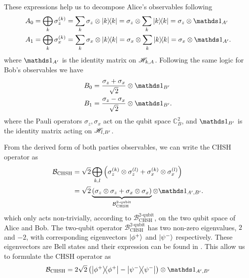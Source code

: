 These expressions help us to decompose Alice's observables following
\begin{equation}
	\begin{split}
		A_0 &= \bigoplus_k \sigma_z^{(k)} = \sum_k \sigma_z \otimes \ketbra{k}  = \sigma_z \otimes \sum_k \ketbra{k} = \sigma_z \otimes \id_{A'} \\
		A_1 &= \bigoplus_k \sigma_x^{(k)} = \sum_k \sigma_x \otimes \ketbra{k}  = \sigma_x \otimes \sum_k \ketbra{k} = \sigma_x \otimes \id_{A'}.
	\end{split}
	\label{eq:pauli_Alice}
\end{equation}
where $\id_{A'}$ is the identity matrix on $\mathscr{H}_{k,A}$.
Following the same logic for Bob's observables we have
\begin{equation}
	\begin{split}
		B_0 &= \frac{\sigma_z + \sigma_x}{\sqrt{2}} \otimes \id_{B'} \\
		B_1 &= \frac{\sigma_z - \sigma_x}{\sqrt{2}} \otimes \id_{B'}.
	\end{split}	
	\label{eq:pauli_Bob}
\end{equation}
where the Pauli operators $\sigma_z,\sigma_x$ act on the qubit space $\mathds{C}^2_B$, and $\id_{B'}$ is the identity matrix acting on $\mathscr{H}_{l,B'}$.

From the derived form of both parties observables, we can write the CHSH operator as
\begin{equation}
	\begin{split}
		\mathcal{B}_\text{CHSH} &= \sqrt{2}\bigoplus_{k,l}\left(\sigma_z^{(k)} \otimes \sigma_z^{(l)} + \sigma_x^{(k)} \otimes \sigma_x^{(l)}\right) \\
								&= \sqrt{2}\underbrace{(\sigma_z \otimes \sigma_z + \sigma_x \otimes \sigma_x)}_{\mathcal{B}_\text{CHSH}^\text{2-qubit}} \otimes \id_{A',B'}.
	\end{split}
\end{equation}
which only acts non-trivially, according to $\mathcal{B}_\text{CHSH}^\text{2-qubit}$, on the two qubit space of Alice and Bob.
The two-qubit operator $\mathcal{B}_\text{CHSH}^\text{2-qubit}$ has two non-zero eigenvalues, $2$ and $-2$, with corresponding eigenvectors $\ket{\phi^+}$ and $\ket{\psi^-}$ respectively. These eigenvectors are Bell states and their expression can be found in .
This allow us to formulate the CHSH operator as
\begin{equation}
	\mathcal{B}_\text{CHSH}	= 2\sqrt{2}\left(\ketbra{\phi^+}-\ketbra{\psi^-}\right) \otimes \id_{A',B'}
\end{equation}

